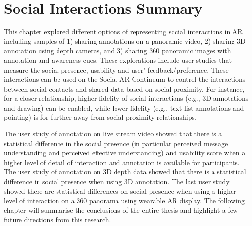 \section{Social Interactions Summary}

This chapter explored different options of representing social interactions in AR including samples of 1) sharing annotations on a panoramic video, 2) sharing 3D annotation using depth cameras, and 3) sharing 360 panoramic images with annotation and awareness cues. These explorations include user studies that measure the social presence, usability and user' feedback/preference. These interactions can be used on the Social AR Continuum to control the interactions between social contacts and shared data based on social proximity. For instance, for a closer relationship, higher fidelity of social interactions (e.g., 3D annotations and drawing) can be enabled, while lower fidelity (e.g., text list annotations and pointing) is for further away from social proximity relationships.

The user study of annotation on live stream video showed that there is a statistical difference in the social presence (in particular perceived message understanding and perceived effective understanding) and usability score when a higher level of detail of interaction and annotation is available for participants. The user study of annotation on 3D depth data showed that there is a statistical difference in social presence when using 3D annotation. The last user study showed there are statistical differences on social presence when using a higher level of interaction on a 360 panorama using wearable AR display. The following chapter will summarise the conclusions of the entire thesis and highlight a few future directions from this research.
